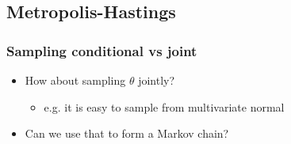 \documentclass[10pt]{beamer}
\begin{document}
\subsection{Metropolis-Hastings}

\begin{frame}

\frametitle{Sampling conditional vs joint}

  \begin{itemize}
  \item How about sampling $\theta$ jointly?
    \begin{itemize}
    \item e.g. it is easy to sample from multivariate normal
    \end{itemize}
    \item<2-> Can we use that to form a Markov chain?
  \end{itemize}

\end{frame}
\end{document}
